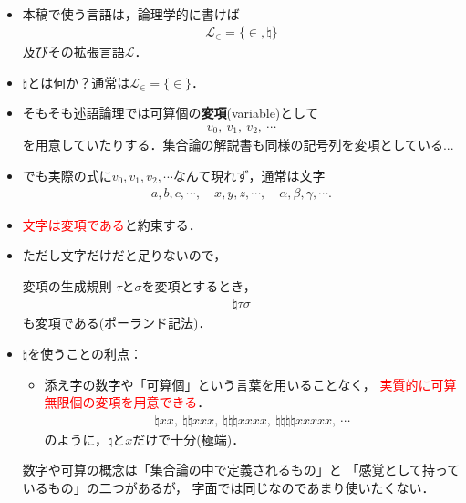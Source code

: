 	\begin{itemize}
		\item 本稿で使う言語は，論理学的に書けば
			\begin{align}
				\mathcal{L}_{\in} = \{\in,\natural\}
			\end{align}
			及びその拡張言語$\mathcal{L}$．
			
		\item $\natural$とは何か？通常は$\mathcal{L}_{\in} = \{\in\}$．
		
		\item そもそも述語論理では可算個の{\bf 変項}{(variable)}として
			\begin{align}
				v_{0},\ v_{1},\ v_{2},\ \cdots
			\end{align}
			を用意していたりする．集合論の解説書も同様の記号列を変項としている...
			
\newpage
		\item でも実際の式に$v_{0},v_{1},v_{2},\cdots$なんて現れず，通常は文字
			\begin{align}
				a,b,c,\cdots, \quad x,y,z,\cdots, \quad \alpha,\beta,\gamma,\cdots.
			\end{align}
		
		\item \textcolor{red}{文字は変項である}と約束する．
			
		\item ただし文字だけだと足りないので，
			
			\begin{itembox}[l]{変項の生成規則}
				$\tau$と$\sigma$を変項とするとき，
				\begin{align}
					\natural \tau \sigma
				\end{align}
				も変項である(ポーランド記法)．
			\end{itembox}
	
\newpage
		\item $\natural$を使うことの利点：
			\begin{itemize}
				\item 添え字の数字や「可算個」という言葉を用いることなく，
					\textcolor{red}{実質的に可算無限個の変項を用意できる}．
					\begin{align}
						\natural xx,\ \natural \natural xxx,\ \natural \natural \natural xxxx,\ 
						\natural \natural \natural \natural xxxxx,\ \cdots
					\end{align}
					のように，$\natural$と$x$だけで十分(極端)． 
			\end{itemize}
			
			数字や可算の概念は「集合論の中で定義されるもの」と
			「感覚として持っているもの」の二つがあるが，
			字面では同じなのであまり使いたくない．
	\end{itemize}

